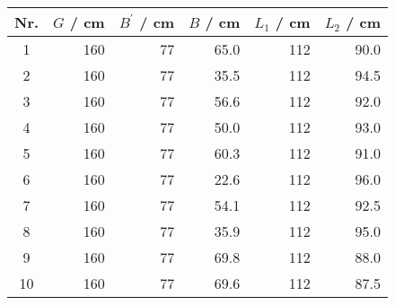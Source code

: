 \begin{tabular}{c|rrrrr}
Nr. & $G$ / cm & $B^\prime$ / cm & $B$ / cm & $L_1$ / cm & $L_2$ / cm \\
\hline
1 & 160 & 77 & 65.0 & 112 & 90.0\\
2 & 160 & 77 & 35.5 & 112 & 94.5\\
3 & 160 & 77 & 56.6 & 112 & 92.0\\
4 & 160 & 77 & 50.0 & 112 & 93.0\\
5 & 160 & 77 & 60.3 & 112 & 91.0\\
6 & 160 & 77 & 22.6 & 112 & 96.0\\
7 & 160 & 77 & 54.1 & 112 & 92.5\\
8 & 160 & 77 & 35.9 & 112 & 95.0\\
9 & 160 & 77 & 69.8 & 112 & 88.0\\
10 & 160 & 77 & 69.6 & 112 & 87.5
\end{tabular}
